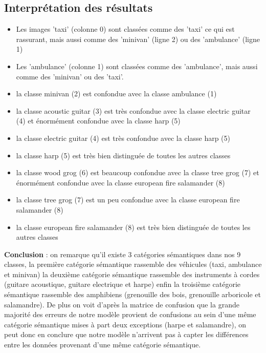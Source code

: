 \documentclass[a4paper]{article}
\begin{document}
\subsection{Interprétation des résultats}
\begin{itemize}
\item Les images 'taxi' (colonne 0) sont classées comme des 'taxi' ce qui est rassurant, mais aussi comme des 'minivan' (ligne 2) ou des 'ambulance' (ligne 1)
\item Les 'ambulance' (colonne 1) sont classées comme des 'ambulance', mais aussi comme des 'minivan' ou des 'taxi'.
\item la classe minivan (2) est confondue avec la classe ambulance (1)
\item la classe acoustic guitar (3) est très confondue avec la classe electric guitar (4) et énormément confondue avec la classe harp (5)
\item la classe electric guitar (4) est très confondue avec la classe harp (5)
\item la classe harp (5) est très bien distinguée de toutes les autres classes
\item la classe wood grog (6) est beaucoup confondue avec la classe tree grog (7) et énormément confondue avec la classe european fire salamander (8)
\item la classe tree grog (7) est un peu confondue avec la classe european fire salamander (8)
\item la classe european fire salamander (8) est très bien distinguée de toutes les autres classes
\end{itemize}
\textbf{Conclusion} : on remarque qu'il existe 3 catégories sémantiques dans nos 9 classes, la première catégorie sémantique rassemble des véhicules (taxi, ambulance et minivan) la deuxième catégorie sémantique rassemble des instruments à cordes (guitare acoustique, guitare electrique et harpe) enfin la troisième catégorie sémantique rassemble des amphibiens (grenouille des bois, grenouille arboricole et salamandre). De plus on voit d'après la matrice de confusion que la grande majorité des erreurs de notre modèle provient de confusions au sein d'une même catégorie sémantique mises à part deux exceptions (harpe et salamandre), on peut donc en conclure que notre modèle n'arrivent pas à capter les différences entre les données provenant d'une même catégorie sémantique.
\end{document}
